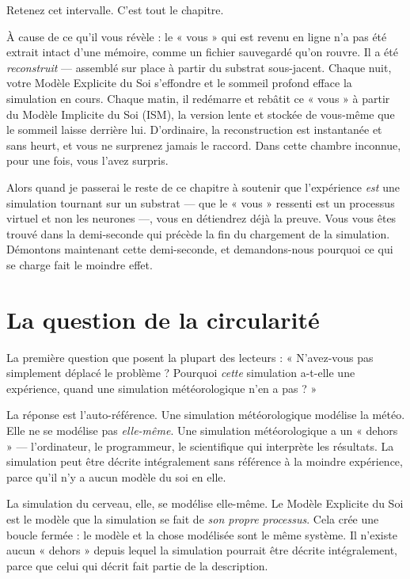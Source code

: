 \documentclass[11pt, twoside, openright]{book}
\begin{document}
Retenez cet intervalle. C'est tout le chapitre.

À cause de ce qu'il vous révèle : le « vous » qui est revenu en ligne n'a pas été extrait intact d'une mémoire, comme un fichier sauvegardé qu'on rouvre. Il a été \textit{reconstruit} --- assemblé sur place à partir du substrat sous-jacent. Chaque nuit, votre Modèle Explicite du Soi s'effondre et le sommeil profond efface la simulation en cours. Chaque matin, il redémarre et rebâtit ce « vous » à partir du Modèle Implicite du Soi (ISM), la version lente et stockée de vous-même que le sommeil laisse derrière lui. D'ordinaire, la reconstruction est instantanée et sans heurt, et vous ne surprenez jamais le raccord. Dans cette chambre inconnue, pour une fois, vous l'avez surpris.

Alors quand je passerai le reste de ce chapitre à soutenir que l'expérience \textit{est} une simulation tournant sur un substrat --- que le « vous » ressenti est un processus virtuel et non les neurones ---, vous en détiendrez déjà la preuve. Vous vous êtes trouvé dans la demi-seconde qui précède la fin du chargement de la simulation. Démontons maintenant cette demi-seconde, et demandons-nous pourquoi ce qui se charge fait le moindre effet.

\section*{La question de la circularité}

La première question que posent la plupart des lecteurs : « N'avez-vous pas simplement déplacé le problème ? Pourquoi \textit{cette} simulation a-t-elle une expérience, quand une simulation météorologique n'en a pas ? »

La réponse est l'auto-référence. Une simulation météorologique modélise la météo. Elle ne se modélise pas \textit{elle-même}. Une simulation météorologique a un « dehors » --- l'ordinateur, le programmeur, le scientifique qui interprète les résultats. La simulation peut être décrite intégralement sans référence à la moindre expérience, parce qu'il n'y a aucun modèle du soi en elle.

La simulation du cerveau, elle, se modélise elle-même. Le Modèle Explicite du Soi est le modèle que la simulation se fait de \textit{son propre processus}. Cela crée une boucle fermée : le modèle et la chose modélisée sont le même système. Il n'existe aucun « dehors » depuis lequel la simulation pourrait être décrite intégralement, parce que celui qui décrit fait partie de la description.
\end{document}
